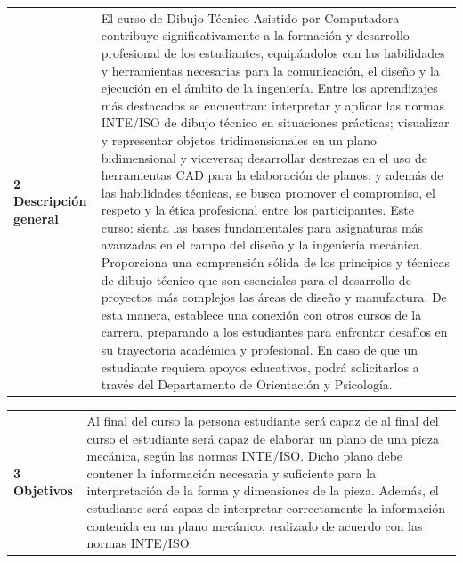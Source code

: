 \documentclass[letterpaper]{article}%
\begin{document}
\begin{tabularx}{\textwidth}{>{\raggedright}p{}p{}}%
\par\fontsize{12}{0}\selectfont \textbf{\textcolor{parte}{2 Descripción general}}&El curso de Dibujo Técnico Asistido por Computadora contribuye significativamente a la formación y desarrollo profesional de los estudiantes, equipándolos con las habilidades y herramientas necesarias para la comunicación, el diseño y la ejecución en el ámbito de la ingeniería.
\newline%
Entre los aprendizajes más destacados se encuentran:  interpretar y aplicar las normas INTE/ISO de dibujo técnico en situaciones prácticas; visualizar y representar objetos tridimensionales en un plano bidimensional y viceversa; desarrollar destrezas en el uso de herramientas CAD para la elaboración de planos; y además de las habilidades técnicas, se busca promover el compromiso, el respeto y la ética profesional entre los participantes.​
\newline%
Este curso: sienta las bases fundamentales para asignaturas más avanzadas en el campo del diseño y la ingeniería mecánica. Proporciona una comprensión sólida de los principios y técnicas de dibujo técnico que son esenciales para el desarrollo de proyectos más complejos las áreas de diseño y manufactura. De esta manera, establece una conexión con otros cursos de la carrera, preparando a los estudiantes para enfrentar desafíos en su trayectoria académica y profesional.​
\newline%
En caso de que un estudiante requiera apoyos educativos, podrá solicitarlos a través del Departamento de Orientación y Psicología.\\%
\end{tabularx}%
\begin{tabularx}{\textwidth}{>{\raggedright}p{}p{}}%
\par\fontsize{12}{0}\selectfont \textbf{\textcolor{parte}{3 Objetivos}}&Al final del curso la persona estudiante será capaz de al final del curso el estudiante será capaz de elaborar un plano de una pieza mecánica, según las normas INTE/ISO. Dicho plano debe contener la información necesaria y suficiente para la interpretación de la forma y dimensiones de la pieza. Además, el estudiante será capaz de interpretar correctamente la información contenida en un plano mecánico, realizado de acuerdo con las normas INTE/ISO.\\%
\end{tabularx}%
\end{document}
